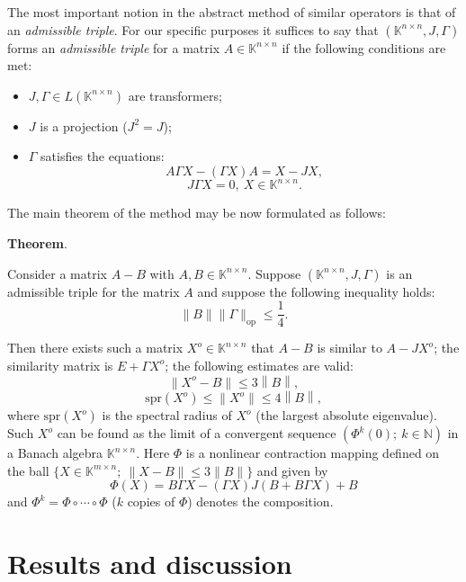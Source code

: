 \documentclass[a4paper]{jpconf}
\newcommand{\nkjpcsthmstyle}{
    \itshape
}
\begin{document}
The most important notion
    in the abstract method of similar operators
    is that of an \emph{admissible triple}.
For our specific purposes it suffices to say
    that \( (\mathbb{K}^{n{\times}n}, J, \Gamma) \)
    forms an \emph{admissible triple}
    for a matrix \( A\in\mathbb{K}^{n{\times}n} \)
    if the following conditions are met:
\begin{itemize}
    \item \( J, \Gamma \in L(\mathbb{K}^{n{\times}n}) \)
        are transformers;
    \item \( J \) is a projection (\( J^2 = J \));
    \item  \( \Gamma \) satisfies the equations:
        \[
            A \Gamma X - (\Gamma X) A = X - JX,
        \]
        \[
            J\Gamma X = 0,\ X\in\mathbb{K}^{n{\times}n}.
        \]
\end{itemize}

The main theorem of the method
    may be now formulated as follows:

\begingroup
\textbf{Theorem}.
\nkjpcsthmstyle
    Consider a matrix \( A - B \)
        with \( A, B \in \mathbb{K}^{n{\times}n} \).
    Suppose \( (\mathbb{K}^{n{\times}n}, J, \Gamma) \)
        is an admissible triple for the matrix \( A \)
        and suppose the following inequality holds:
        \[
            \|B\|\|\Gamma\|_{\mathrm{op}} \leq \frac14.
        \]

    Then there exists such a matrix \( X^o\in\mathbb{K}^{n{\times}n} \)
        that \( A - B \) is similar to \( A - J X^o \);
        the similarity matrix is \( E + \Gamma X^o \);
        the following estimates are valid:
        \[
            \|X^o - B\| \leq 3 \left\|B\right\|,
        \]
        \[
            \mathrm{spr}(X^o) \leq \|X^o\| \leq 4 \left\|B\right\|,
        \]
        where \( \mathrm{spr}(X^o) \)
        is the spectral radius of \( X^o \) (the largest absolute eigenvalue).
    Such \( X^o \) can be found as the limit of a convergent sequence
        \( \left( \Phi^k(0);\ k\in\mathbb{N} \right) \)
        in a Banach algebra \( \mathbb{K}^{n{\times}n} \).
        Here \( \Phi \) is a nonlinear contraction mapping
        defined on the ball \( \{X\in\mathbb{K}^{m{\times}n};\ \|X-B\|\leq 3\|B\| \} \)
        and given by
    \[
        \Phi(X) = B\Gamma X - (\Gamma X)J(B + B\Gamma X) + B
    \]
        and \( \Phi^k = \Phi\circ\cdots\circ\Phi \)
        (\( k \) copies of \( \Phi \))
        denotes the composition.
\endgroup

\section{Results and discussion}
\end{document}

